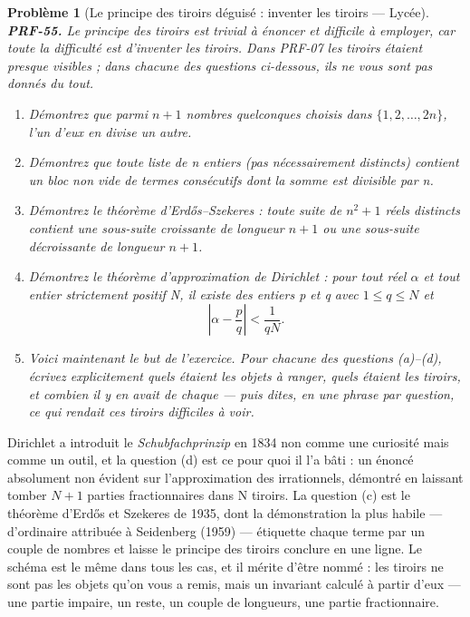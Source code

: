 \documentclass[11pt]{article}
\newtheorem{problem}{Problème}
\begin{document}
\bigskip

\begin{problem}[{Le principe des tiroirs déguisé : inventer les tiroirs --- Lycée}]
\textbf{PRF-55.} Le principe des tiroirs est trivial à énoncer et difficile à employer,
car toute la difficulté est d'inventer les tiroirs. Dans PRF-07 les tiroirs étaient presque
visibles ; dans chacune des questions ci-dessous, ils ne vous sont pas donnés du tout.
\begin{enumerate}
\item[(a)] Démontrez que parmi $ n+1 $ nombres quelconques choisis dans
$ \{1, 2, \dots, 2n\} $, l'un d'eux en divise un autre.
\item[(b)] Démontrez que toute liste de n entiers (pas nécessairement distincts) contient un bloc
non vide de termes consécutifs dont la somme est divisible par n.
\item[(c)] Démontrez le théorème d'Erd\H{o}s--Szekeres : toute suite de $ n^2 + 1 $ réels distincts
contient une sous-suite croissante de longueur $ n+1 $ ou une sous-suite décroissante de
longueur $ n+1 $.
\item[(d)] Démontrez le théorème d'approximation de Dirichlet : pour tout réel $\alpha$ et tout entier
strictement positif N, il existe des entiers p et q avec $ 1 \le q \le N $ et
\[ \left| \alpha - \frac{p}{q} \right| < \frac{1}{qN}. \]
\item[(e)] Voici maintenant le but de l'exercice. Pour chacune des questions (a)--(d), écrivez
explicitement quels étaient les objets à ranger, quels étaient les tiroirs, et combien il y
en avait de chaque --- puis dites, en une phrase par question, ce qui rendait ces tiroirs
difficiles à voir.
\end{enumerate}

\end{problem}

\noindent Dirichlet a introduit le \textit{Schubfachprinzip} en 1834 non comme une
curiosité mais comme un outil, et la question (d) est ce pour quoi il l'a bâti : un énoncé
absolument non évident sur l'approximation des irrationnels, démontré en laissant tomber
$ N+1 $ parties fractionnaires dans N tiroirs. La question (c) est le théorème d'Erd\H{o}s et
Szekeres de 1935, dont la démonstration la plus habile --- d'ordinaire attribuée à Seidenberg
(1959) --- étiquette chaque terme par un couple de nombres et laisse le principe des tiroirs
conclure en une ligne. Le schéma est le même dans tous les cas, et il mérite d'être nommé :
les tiroirs ne sont pas les objets qu'on vous a remis, mais un invariant calculé à partir
d'eux --- une partie impaire, un reste, un couple de longueurs, une partie fractionnaire.
\end{document}
